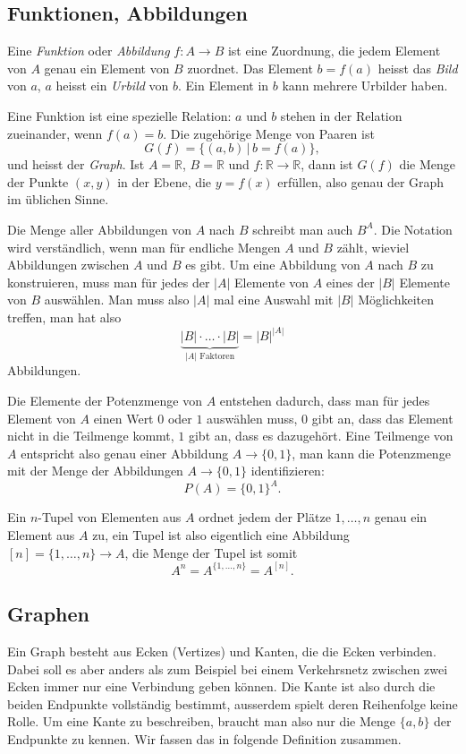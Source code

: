 \subsection{Funktionen, Abbildungen}
%
%
Eine {\em Funktion} oder {\em Abbildung} $f\colon A\to B$ ist
eine Zuordnung, die
jedem Element von $A$ genau ein Element von $B$ zuordnet.
%
%
Das Element
$b=f(a)$ heisst das {\em Bild} von $a$, $a$ heisst ein {\em Urbild} von $b$. Ein
Element in $b$ kann mehrere Urbilder haben.

Eine Funktion ist eine spezielle Relation: 
$a$  und $b$ stehen in der Relation zueinander, wenn $f(a)=b$. 
%
Die zugehörige Menge von Paaren ist
\[
G(f)=\{(a,b)\,|\,b=f(a)\},
\]
und heisst der {\em Graph}. Ist $A=\mathbb R$, $B=\mathbb R$ und
$f\colon\mathbb R\to\mathbb R$, dann ist $G(f)$ die Menge
der Punkte $(x,y)$ in der Ebene, die $y=f(x)$ erfüllen, also
genau der Graph im üblichen Sinne.

%
Die Menge aller Abbildungen von $A$ nach $B$ schreibt man auch
$B^A$. Die Notation wird verständlich, wenn man für endliche
Mengen $A$ und $B$ zählt, wieviel
Abbildungen zwischen $A$ und $B$ es gibt. Um eine Abbildung von
$A$ nach $B$ zu konstruieren, muss man für jedes der $|A|$ Elemente von $A$
eines der $|B|$ Elemente von $B$ auswählen. Man muss also $|A|$ mal
eine Auswahl mit $|B|$ Möglichkeiten treffen, man hat also
\[
\underbrace{|B|\cdot\dots\cdot|B|}_{\text{$|A|$ Faktoren}}=|B|^{|A|}
\]
Abbildungen.

Die Elemente der Potenzmenge von $A$ entstehen dadurch, dass man für jedes
Element von $A$ einen Wert $0$ oder $1$ auswählen muss, $0$ gibt an,
dass das Element nicht in die Teilmenge kommt, $1$ gibt an, dass es dazugehört.
Eine Teilmenge von $A$ entspricht also genau einer Abbildung $A\to\{0,1\}$,
man kann die Potenzmenge mit der Menge der Abbildungen $A\to\{0,1\}$
identifizieren:
\[
P(A) = \{0,1\}^{A}.
\]

Ein $n$-Tupel von Elementen aus $A$ ordnet jedem der Plätze
$1,\dots,n$ genau ein Element aus $A$ zu, ein Tupel ist also eigentlich
eine Abbildung $[n]=\{1,\dots,n\}\to A$, die Menge der Tupel ist somit
\[
A^n=A^{\{1,\dots,n\}}=A^{[n]}.
\]

\subsection{Graphen}
%
%
%
Ein Graph besteht aus Ecken (Vertizes) und Kanten,
die die Ecken verbinden.
Dabei
soll es aber anders als zum Beispiel bei einem Verkehrsnetz zwischen zwei
Ecken immer nur eine Verbindung geben können. Die Kante ist also durch
die beiden Endpunkte vollständig bestimmt, ausserdem spielt deren
Reihenfolge keine Rolle. Um eine Kante zu beschreiben, braucht man
also nur die Menge $\{a,b\}$ der Endpunkte zu kennen.
Wir fassen das in folgende Definition zusammen.

